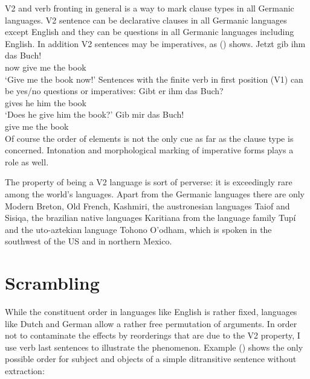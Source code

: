 V2 and verb fronting in general is a way to mark clause types in all Germanic languages. V2 sentence
can be declarative clauses in all Germanic languages except English and they can be questions in all
Germanic languages including English. In addition V2 sentences may be imperatives, as () shows.
\ea
\gll Jetzt gib ihm das Buch!\\
     now give me the book\\\german
\glt `Give me the book now!'
\z
Sentences with the finite verb in first position (V1) can be yes/no questions or imperatives:
\eal
\ex
\gll Gibt er ihm das Buch?\\
     gives he him the book\\\german
\glt `Does he give him the book?'
\ex 
\gll Gib mir das Buch!\\
     give me the book\\
\zl
Of course the order of elements is not the only cue as far as the clause type is
concerned. Intonation and morphological marking of imperative forms plays a role as well.

The property of being a V2 language is sort of perverse: it is exceedingly rare among the world's
languages. Apart from the Germanic languages there are only Modern Breton, Old French, Kashmiri, the
austronesian languages Taiof and Sisiqa, the brazilian native languages Karitiana from the language
family Tupí and the uto-aztekian language Tohono O'odham, which is spoken in the southwest of the US
and in northern Mexico.


\section{Scrambling}

While the constituent order in languages like English is rather fixed, languages like Dutch and
German allow a rather free permutation of arguments. In order not to contaminate the effects by
reorderings that are due to the V2 property, I use verb last sentences to illustrate the
phenomenon. Example () shows the only possible order for subject and objects of a simple
ditransitive sentence without extraction:



